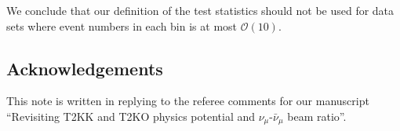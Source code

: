 \documentclass[12pt,a4paper]{article}
\newcommand{\order}{{\mathcal O}}
\begin{document}
We conclude that our definition of the test statistics should not be
used for data sets where event numbers in each bin is at most $\order(10)$. 
\subsection*{Acknowledgements}
This note is written in replying to the referee comments for our
manuscript ``Revisiting T2KK and T2KO physics potential and
$\nu_\mu$-$\bar{\nu}_\mu$ beam ratio''.

%
%
\end{document}
